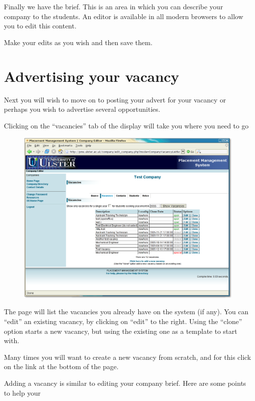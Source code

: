 \documentclass{article}
\begin{document}
Finally we have the brief. This is an area in which you can
describe your company to the students. An editor is available in
all modern browsers to allow you to edit this content.

Make your edits as you wish and then save them.

\section{Advertising your vacancy}

Next you will wish to move on to posting your advert for your
vacancy or perhaps you wish to advertise several opportunities.

Clicking on the ``vacancies'' tab of the display will take you
where you need to go
\begin{figure}[htb]
\begin{center}
\includegraphics[scale=0.25]{png/company_hr4.png}
\end{center}
\end{figure}


The page will list the vacancies you already have on the system
(if any). You can ``edit'' an existing vacancy, by clicking on
``edit'' to the right. Using the ``clone'' option starts a new
vacancy, but using the existing one as a template to start with.

Many times you will want to create a new vacancy from scratch,
and for this click on the link at the bottom of the page.

Adding a vacancy is similar to editing your company brief.
Here are some points to help your
\end{document}
